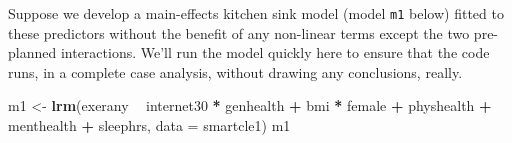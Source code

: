 \documentclass[]{book}
\newenvironment{Shaded}{\begin{snugshade}}{\end{snugshade}}
\newcommand{\KeywordTok}[1]{\textcolor[rgb]{0.13,0.29,0.53}{\textbf{#1}}}
\newcommand{\DataTypeTok}[1]{\textcolor[rgb]{0.13,0.29,0.53}{#1}}
\newcommand{\StringTok}[1]{\textcolor[rgb]{0.31,0.60,0.02}{#1}}
\newcommand{\OperatorTok}[1]{\textcolor[rgb]{0.81,0.36,0.00}{\textbf{#1}}}
\newcommand{\NormalTok}[1]{#1}
\theoremstyle{definition}
\theoremstyle{definition}
\theoremstyle{definition}
\theoremstyle{remark}
\begin{document}
Suppose we develop a main-effects kitchen sink model (model \texttt{m1}
below) fitted to these predictors without the benefit of any non-linear
terms except the two pre-planned interactions. We'll run the model
quickly here to ensure that the code runs, in a complete case analysis,
without drawing any conclusions, really.

\begin{Shaded}
\begin{Highlighting}[]
\NormalTok{m1 <-}\StringTok{ }\KeywordTok{lrm}\NormalTok{(exerany }\OperatorTok{~}\StringTok{ }\NormalTok{internet30 }\OperatorTok{*}\StringTok{ }\NormalTok{genhealth }\OperatorTok{+}\StringTok{ }\NormalTok{bmi }\OperatorTok{*}\StringTok{ }\NormalTok{female }\OperatorTok{+}
\StringTok{              }\NormalTok{physhealth }\OperatorTok{+}\StringTok{ }\NormalTok{menthealth }\OperatorTok{+}\StringTok{ }\NormalTok{sleephrs, }
          \DataTypeTok{data =}\NormalTok{ smartcle1)}
\NormalTok{m1}
\end{Highlighting}
\end{Shaded}
\end{document}

